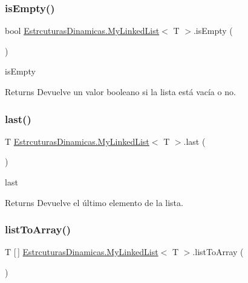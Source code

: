 \subsubsection{\texorpdfstring{is\+Empty()}{isEmpty()}}
{\footnotesize\ttfamily bool \mbox{\hyperlink{class_estrcuturas_dinamicas_1_1_my_linked_list}{Estrcuturas\+Dinamicas.\+My\+Linked\+List}}$<$ T $>$.is\+Empty (\begin{DoxyParamCaption}{ }\end{DoxyParamCaption})}



is\+Empty 

\begin{DoxyReturn}{Returns}
Devuelve un valor booleano si la lista está vacía o no.
\end{DoxyReturn}
\mbox{\label{class_estrcuturas_dinamicas_1_1_my_linked_list_aa714154b072bdd50f780bb38244a7199}} 
\subsubsection{\texorpdfstring{last()}{last()}}
{\footnotesize\ttfamily T \mbox{\hyperlink{class_estrcuturas_dinamicas_1_1_my_linked_list}{Estrcuturas\+Dinamicas.\+My\+Linked\+List}}$<$ T $>$.last (\begin{DoxyParamCaption}{ }\end{DoxyParamCaption})}



last 

\begin{DoxyReturn}{Returns}
Devuelve el último elemento de la lista.
\end{DoxyReturn}
\mbox{\label{class_estrcuturas_dinamicas_1_1_my_linked_list_af31dd35b97e335562f10c015aafbb354}} 
\subsubsection{\texorpdfstring{list\+To\+Array()}{listToArray()}}
{\footnotesize\ttfamily T \mbox{[}$\,$\mbox{]} \mbox{\hyperlink{class_estrcuturas_dinamicas_1_1_my_linked_list}{Estrcuturas\+Dinamicas.\+My\+Linked\+List}}$<$ T $>$.list\+To\+Array (\begin{DoxyParamCaption}{ }\end{DoxyParamCaption})}




